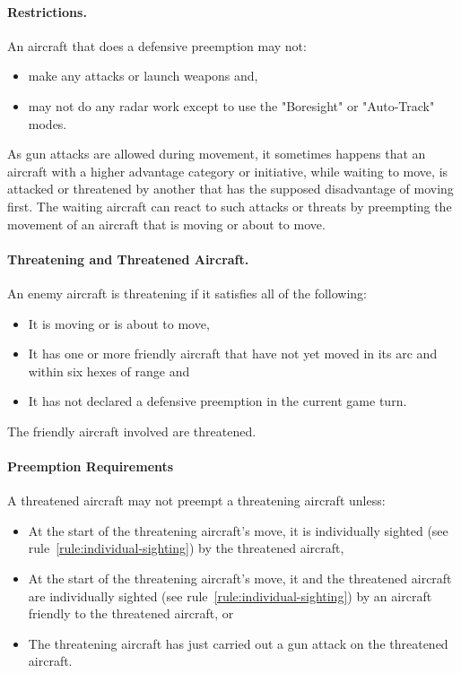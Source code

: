 {\paragraph{Restrictions.} An aircraft that does a defensive preemption may not:  

\begin{itemize}
    \item make any attacks or launch weapons and,
    \item may not do any radar work except to use the "Boresight" or "Auto-Track" modes.
\end{itemize}	
}{

As gun attacks are allowed during movement, it sometimes happens that an aircraft with a higher advantage category or initiative, while waiting to move, is attacked or threatened by another that has the supposed disadvantage of moving first. The waiting aircraft can react to such attacks or threats by preempting the movement of an aircraft that is moving or about to move.

\paragraph{Threatening and Threatened Aircraft.} An enemy aircraft is threatening if it satisfies all of the following:

\begin{itemize}
\item It is moving or is about to move,
\item It has one or more friendly aircraft that have not yet moved in its  arc and within six hexes of range and
\item It has not declared a defensive preemption in the current game turn.
\end{itemize}
The friendly aircraft involved are threatened.

\paragraph{Preemption Requirements} A threatened aircraft may not preempt a threatening aircraft unless:
\begin{itemize}
     \item At the start of the threatening aircraft’s move, it is individually sighted (see rule~\ref{rule:individual-sighting}) by the threatened aircraft,
     \item At the start of the threatening aircraft’s move, it and the threatened aircraft are individually sighted (see rule~\ref{rule:individual-sighting}) by an aircraft friendly to the threatened aircraft, or
     \item The threatening aircraft has just carried out a gun attack on the threatened aircraft.
\end{itemize}

}

